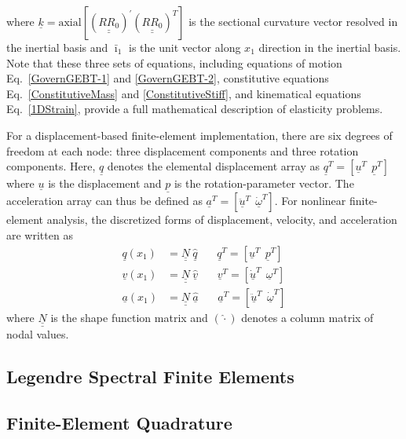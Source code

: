 \documentclass{aiaa-tc}
\newcommand{\tens}[1]{\underline{\underline{#1}}}
\renewcommand{\vec}[1]{\underline{#1}}
\begin{document}
where $\vec{k} = \mathrm{axial}[(\tens{R R_0})^\prime (\tens{R R_0})^T]$ is the sectional
curvature vector resolved in the inertial basis and $\bar{\imath}_1$ is the unit
vector along $x_1$ direction in the inertial basis. Note that these
three sets of equations, including equations of motion
Eq.~\eqref{GovernGEBT-1} and \eqref{GovernGEBT-2}, constitutive equations
Eq.~\eqref{ConstitutiveMass} and \eqref{ConstitutiveStiff}, and kinematical
equations Eq.~\eqref{1DStrain}, provide a full mathematical description of elasticity problems. 

For a displacement-based finite-element implementation, there are six
degrees of freedom at each node: three displacement components and three
rotation components. Here, $\vec{q}$ denotes the elemental
displacement array as $\underline{q}^T=\left[
\underline{u}^T~~\underline{p}^T\right]$ where $\vec{u}$ is the
displacement and $\vec{p}$ is the rotation-parameter vector. The
acceleration array can thus be defined as $\underline{a}^T=\left[
\ddot{\underline{u}}^T~~ \dot{\underline{\omega}}^T \right]$. For nonlinear
finite-element analysis, the discretized forms of
displacement, velocity, and acceleration are written as
\begin{align}
	\label{DiscretizedDisp}
	\underline{q} (x_1) &= \underline{\underline{N}} ~\hat{\underline{q}}~~~~~~~~\underline{q}^T = \left[ \underline{u}^T~~\underline{p}^T \right] \\
	\label{DiscretizedVel}
	\underline{v}(x_1) &= \underline{\underline{N}}~\hat{\underline{v}}~~~~~~~~\underline{v}^T = \left[\underline{\dot{u}}^T~~\underline{\omega}^T \right] \\
	\label{DiscretizedAcc}
	\underline{a}(x_1) &= \underline{\underline{N}}~ \hat{\underline{a}}~~~~~~~~\underline{a}^T = \left[ \ddot{\underline{u}}^T~~\dot{\underline{\omega}}^T \right]	
\end{align}
where $\tens{N}$ is the shape function matrix and $(\hat{\cdot})$ denotes a
column matrix of nodal values.

\subsection{Legendre Spectral Finite Elements}

\subsection{Finite-Element Quadrature}
\end{document}
